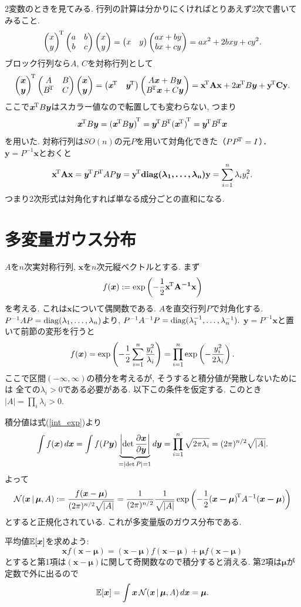 2変数のときを見てみる. 行列の計算は分かりにくければとりあえず2次で書いてみること.
$$
{\begin{pmatrix} x \\ y \end{pmatrix}}^{\!\mathrm{T}}\begin{pmatrix} a & b \\ b & c \end{pmatrix}\begin{pmatrix} x \\ y \end{pmatrix}
=\begin{pmatrix} x & y \end{pmatrix}\begin{pmatrix} ax+by \\ bx+cy \end{pmatrix}=ax^2+2bxy+cy^2.
$$
ブロック行列なら$A$, $C$を対称行列として
$$
\trans{\vvec{\bm{x}}{\bm{y}}}\matt{A}{B}{{\trans{B}}}{C}\vvec{\bm{x}}{\bm{y}}
 =\hvec{\trans{\bm{x}}}{\trans{\bm{y}}}\vvec{A\bm{x}+B\bm{y}}{\trans{B}\bm{x}+C\bm{y}}
 =\quadf{A}{x}+2\trans{\bm{x}}B\bm{y}+\quadf{C}{y}.
$$
ここで${\bm{x}}^{\!\mathrm{T}}B\bm{y}$はスカラー値なので転置しても変わらない,
つまり
$$
\trans{\bm{x}}B\bm{y}
=\trans{(\trans{\bm{x}}B\bm{y})}
=\trans{\bm{y}}\trans{B}\trans{(\trans{\bm{x}})}
=\trans{\bm{y}}\trans{B}\bm{x}
$$
を用いた.
対称行列は$SO(n)$の元$P$を用いて対角化できた（$P{P}^{\!\mathrm{T}}=I$）．
$\bm{y}=P^{-1}\bm{x}$とおくと
$$
{\mathbf{\boldsymbol{x}}}^{\!\mathrm{T}} \mathbf{\boldsymbol{A}} \mathbf{\boldsymbol{x}}
={\bm{y}}^{\!\mathrm{T}}{P}^{\!\mathrm{T}}AP\bm{y}
={\mathbf{\boldsymbol{y}}}^{\!\mathrm{T}} \mathbf{\boldsymbol{\mathop{\mathrm{diag}}\nolimits(\lambda_1,\ldots,\lambda_n)}} \mathbf{\boldsymbol{y}}=\sum_{i=1}^n \lambda_i y_i^2.
$$
つまり2次形式は対角化すれば単なる成分ごとの直和になる.

\section{多変量ガウス分布}

$A$を$n$次実対称行列, $\bm{x}$を$n$次元縦ベクトルとする.
まず
$$
f(\bm{x}):=\exp\left(-\frac{1}{2}{\mathbf{\boldsymbol{x}}}^{\!\mathrm{T}} \mathbf{\boldsymbol{A^{-1}}} \mathbf{\boldsymbol{x}}\right)
$$
を考える.
これは$\bm{x}$について偶関数である.
$A$を直交行列$P$で対角化する.
$P^{-1}AP=\mathop{\mathrm{diag}}\nolimits(\lambda_1, \ldots, \lambda_n)$より, $P^{-1}A^{-1}P=\mathop{\mathrm{diag}}\nolimits(\lambda_1^{-1}, \ldots, \lambda_n^{-1}).$
$\bm{y}=P^{-1}\bm{x}$と置いて前節の変形を行うと
$$f(\bm{x})
=\exp\left(-\frac{1}{2}\sum_{i=1}^n \frac{y_i^2}{\lambda_i}\right)
=\prod_{i=1}^n\exp\left(-\frac{y_i^2}{2\lambda_i}\right).$$
ここで区間$(-\infty,\infty)$の積分を考えるが, そうすると積分値が発散しないためには
全ての$\lambda_i>0$である必要がある. 以下この条件を仮定する.
このとき$|A|=\prod_i \lambda_i>0$.

積分値は式(\ref{int_exp})より
$$
\int f(\bm{x})\,d\bm{x}
=\int f(P\bm{y})
 \underbrace{\left|\det\frac{\partial \bm{x}}{\partial \bm{y}}\right|}
 _{= \mathopen|\det P\mathclose| = 1}
 d\bm{y}
=\prod_{i=1}^n \sqrt{2\pi\lambda_i} = (2\pi)^{n/2} \sqrt{|A|}.
$$
よって
$$
\fnvPair\calN(\bm{x}|\bm{\mu}, A)
  :=\frac{f(\bm{x}-\bm{\mu})}{(2\pi)^{\sfrac{n}{2}} \sqrt{|A|}}
  =\frac1{(2\pi)^{\sfrac{n}{2}}} \frac{1}{\sqrt{|A|}}\exp\left(-\half\trans{(\bm{x-\mu})}A^{-1}(\bm{x-\mu})\right)
$$
とすると正規化されている.
これが多変量版のガウス分布である.

平均値$\mathbb{E}[\bm{x}]$を求めよう:
$$
\bm{x}f(\bm{x}-\bm{\mu})
 =(\bm{x}-\bm{\mu})f(\bm{x}-\bm{\mu}) + \bm{\mu}f(\bm{x}-\bm{\mu})
$$
とすると第1項は$(\bm{x}-\bm{\mu})$に関して奇関数なので積分すると消える.
第2項は$\bm{\mu}$が定数で外に出るので
$$
\EE[\bm{x}]
= \int \bm{x}\, \fnvPair\calN(\bm{x}|\bm{\mu}, A) d\bm{x}
= \bm{\mu}.
$$

